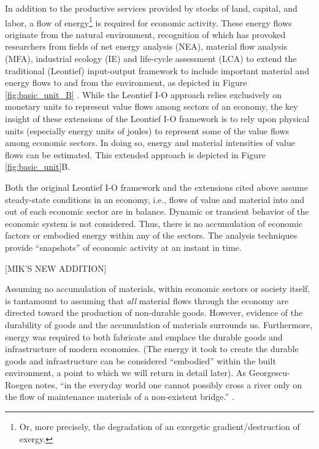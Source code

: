 In addition to the productive services provided by stocks of land, capital, and labor,
a flow of energy\footnote{Or, more precisely, the degradation of an exergetic gradient/destruction of exergy.} is  required for economic activity. These energy flows originate from the natural environment, recognition of which has provoked researchers from fields of net energy analysis (NEA), material flow analysis (MFA), industrial ecology (IE) and life-cycle assessment (LCA) to extend the traditional (Leontief) input-output framework to include important material and energy flows to and from the environment, as depicted in Figure \ref{fig:basic_unit_B} \cite{Carter1974,Bullard1975,Bullard1976a,Herendeen1978,Costanza:1980ww,Casler1984,Joshi1999,Suh2009}. While the Leontief I-O approach relies exclusively on monetary units to represent value flows among sectors of an economy, the key insight of these extensions of the Leontief I-O framework is to rely upon physical units (especially energy units of joules) to represent some of the value flows among economic sectors. In doing so, energy and material intensities of value flows can be estimated. This extended approach is depicted in Figure \ref{fig:basic_unit}B. 

Both the original Leontief I-O framework and the extensions cited above assume steady-state conditions in an economy, i.e., flows of value and material into and out of each economic sector are in balance. Dynamic or transient behavior of the economic system is not considered. Thus, there is no accumulation of economic factors or embodied energy within any of the sectors. The analysis techniques provide ``snapshots'' of economic activity at an instant in time.

[MIK'S NEW ADDITION]

Assuming no accumulation of materials, within economic sectors or society itself, is tantamount to assuming that \emph{all} material flows through the economy are directed toward the production of non-durable goods. However, evidence of the durability of goods and the accumulation of materials surrounds us. Furthermore, energy was required to both fabricate and emplace the durable goods and infrastructure of modern economies. (The energy it took to create the durable goods and infrastructure can be considered ``embodied'' within the built environment, a point to which we will return in detail later). As Georgescu-Roegen notes, ``in the everyday world one cannot possibly cross a river only on the flow of maintenance materials of a non-existent bridge.'' \cite{G-R1975}. 

